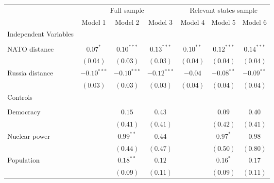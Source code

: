 
\begin{table}[h]
\begin{center}
\begin{tabular}{l c c c c c c}
\hline
 & \multicolumn{3}{c}{Full sample} & \multicolumn{3}{c}{Relevant states sample} \\
\cline{2-4} \cline{5-7}
 & Model 1 & Model 2 & Model 3 & Model 4 & Model 5 & Model 6 \\
\hline
Independent Variables &               &               &               &             &              &              \\
                      &               &               &               &             &              &              \\
\quad NATO distance   & $0.07^{*}$    & $0.10^{***}$  & $0.13^{***}$  & $0.10^{**}$ & $0.12^{***}$ & $0.14^{***}$ \\
                      & $(0.04)$      & $(0.03)$      & $(0.03)$      & $(0.04)$    & $(0.04)$     & $(0.04)$     \\
\quad Russia distance & $-0.10^{***}$ & $-0.10^{***}$ & $-0.12^{***}$ & $-0.04$     & $-0.08^{**}$ & $-0.09^{**}$ \\
                      & $(0.03)$      & $(0.03)$      & $(0.03)$      & $(0.04)$    & $(0.04)$     & $(0.04)$     \\
Controls              &               &               &               &             &              &              \\
                      &               &               &               &             &              &              \\
\quad Democracy       &               & $0.15$        & $0.43$        &             & $0.09$       & $0.40$       \\
                      &               & $(0.41)$      & $(0.41)$      &             & $(0.42)$     & $(0.41)$     \\
\quad Nuclear power   &               & $0.99^{**}$   & $0.44$        &             & $0.97^{*}$   & $0.98$       \\
                      &               & $(0.44)$      & $(0.47)$      &             & $(0.50)$     & $(0.80)$     \\
\quad Population      &               & $0.18^{**}$   & $0.12$        &             & $0.16^{*}$   & $0.17$       \\
                      &               & $(0.09)$      & $(0.11)$      &             & $(0.09)$     & $(0.11)$     \\

\end{tabular}
\end{center}
\end{table}
